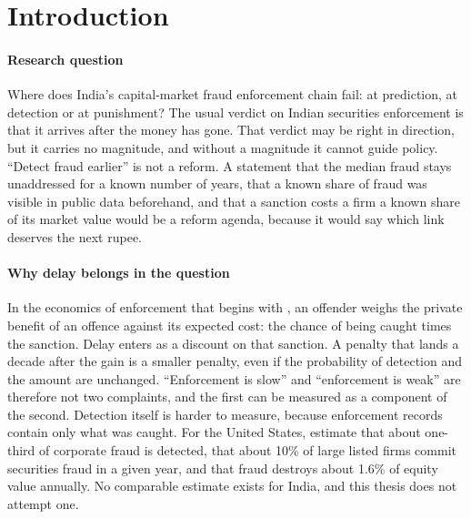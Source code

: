 \documentclass[letterpaper,11pt,leqno]{article}
\begin{document}
\section{Introduction}\label{s:introduction}

\paragraph{Research question} Where does India's capital-market fraud enforcement chain fail: at prediction, at detection or at punishment? The usual verdict on Indian securities enforcement is that it arrives after the money has gone. That verdict may be right in direction, but it carries no magnitude, and without a magnitude it cannot guide policy. ``Detect fraud earlier'' is not a reform. A statement that the median fraud stays unaddressed for a known number of years, that a known share of fraud was visible in public data beforehand, and that a sanction costs a firm a known share of its market value would be a reform agenda, because it would say which link deserves the next rupee.

\paragraph{Why delay belongs in the question} In the economics of enforcement that begins with \citet{B68}, an offender weighs the private benefit of an offence against its expected cost: the chance of being caught times the sanction. Delay enters as a discount on that sanction. A penalty that lands a decade after the gain is a smaller penalty, even if the probability of detection and the amount are unchanged. ``Enforcement is slow'' and ``enforcement is weak'' are therefore not two complaints, and the first can be measured as a component of the second. Detection itself is harder to measure, because enforcement records contain only what was caught. For the United States, \citet{DMZ24} estimate that about one-third of corporate fraud is detected, that about 10\% of large listed firms commit securities fraud in a given year, and that fraud destroys about 1.6\% of equity value annually. No comparable estimate exists for India, and this thesis does not attempt one.
\end{document}
